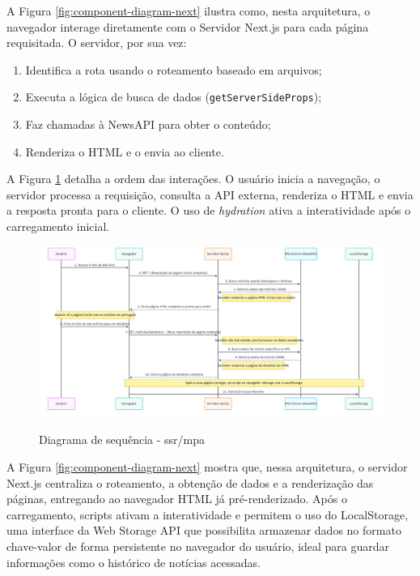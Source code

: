 A Figura \ref{fig:component-diagram-next} ilustra como, nesta arquitetura, o navegador interage diretamente com o Servidor Next.js para cada página requisitada. O servidor, por sua vez:

\begin{enumerate}
  \item Identifica a rota usando o roteamento baseado em arquivos;
  \item Executa a lógica de busca de dados (\texttt{getServerSideProps});
  \item Faz chamadas à NewsAPI para obter o conteúdo;
  \item Renderiza o HTML e o envia ao cliente.
\end{enumerate}

A Figura \ref{fig:sequence-diagram-ssr} detalha a ordem das interações. O usuário inicia a navegação, o servidor processa a requisição, consulta a API externa, renderiza o HTML e envia a resposta pronta para o cliente. O uso de \textit{hydration} ativa a interatividade após o carregamento inicial.

\begin{figure}[H]
  \centering
  \caption{Diagrama de sequência - \acrshort{ssr}/\acrshort{mpa}}
  \includegraphics[width=1\textwidth]{media/wall_tech_sequence_diagram.jpeg}
  \label{fig:sequence-diagram-ssr}
\end{figure}

A Figura \ref{fig:component-diagram-next} mostra que, nessa arquitetura, o servidor Next.js centraliza o roteamento, a obtenção de dados e a renderização das páginas, entregando ao navegador HTML já pré-renderizado. Após o carregamento, scripts ativam a interatividade e permitem o uso do LocalStorage, uma interface da Web Storage API que possibilita armazenar dados no formato chave-valor de forma persistente no navegador do usuário, ideal para guardar informações como o histórico de notícias acessadas.


